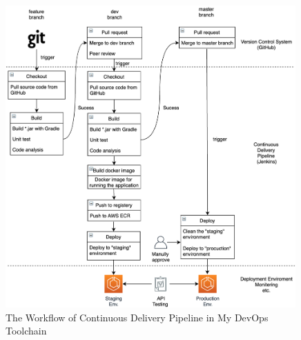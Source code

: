 \begin{figure}[h]
 \centering
 \includegraphics[width=0.99\textwidth]{pics/pipeline.png}
 \caption{The Workflow of Continuous Delivery Pipeline in My DevOps Toolchain}
 \label{fig:pipeline}
\end{figure}
